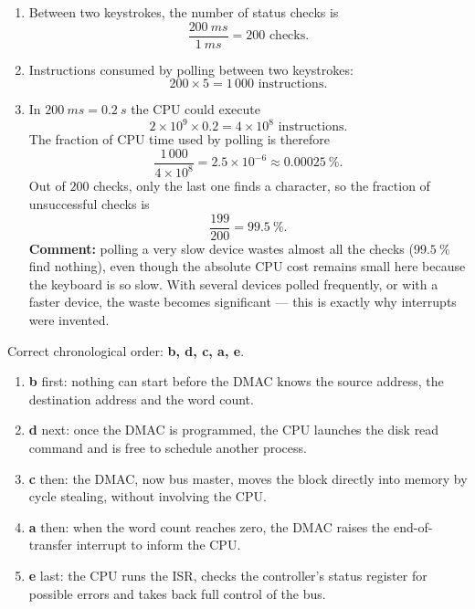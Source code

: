 \documentclass[11pt]{article}
\begin{document}
\begin{corrige}
\begin{enumerate}
\item Between two keystrokes, the number of status checks is
\[ \frac{\SI{200}{ms}}{\SI{1}{ms}} = 200 \text{ checks}. \]
\item Instructions consumed by polling between two keystrokes:
\[ 200 \times 5 = 1\,000 \text{ instructions}. \]
\item In $\SI{200}{ms} = \SI{0.2}{s}$ the CPU could execute
\[ 2\times10^{9} \times 0.2 = 4\times10^{8} \text{ instructions}. \]
The fraction of CPU time used by polling is therefore
\[ \frac{1\,000}{4\times10^{8}} = 2.5\times10^{-6} \approx 0.00025\ \%. \]
Out of $200$ checks, only the last one finds a character, so the fraction of unsuccessful checks is
\[ \frac{199}{200} = 99.5\ \%. \]
\textbf{Comment:} polling a very slow device wastes almost all the checks ($99.5\ \%$ find nothing), even though the absolute CPU cost remains small here because the keyboard is so slow. With several devices polled frequently, or with a faster device, the waste becomes significant --- this is exactly why interrupts were invented.
\end{enumerate}
\end{corrige}

\begin{corrige}
Correct chronological order: \textbf{b, d, c, a, e}.
\begin{enumerate}
\item \textbf{b} first: nothing can start before the DMAC knows the source address, the destination address and the word count.
\item \textbf{d} next: once the DMAC is programmed, the CPU launches the disk read command and is free to schedule another process.
\item \textbf{c} then: the DMAC, now bus master, moves the block directly into memory by cycle stealing, without involving the CPU.
\item \textbf{a} then: when the word count reaches zero, the DMAC raises the end-of-transfer interrupt to inform the CPU.
\item \textbf{e} last: the CPU runs the ISR, checks the controller's status register for possible errors and takes back full control of the bus.
\end{enumerate}
\end{corrige}
\end{document}
